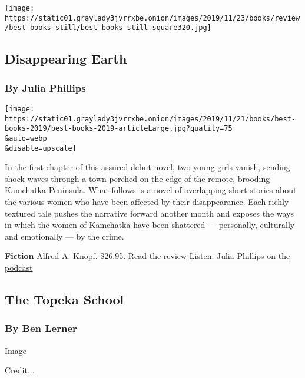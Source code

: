 \texttt{[image: https://static01.graylady3jvrrxbe.onion/images/2019/11/23/books/review/best-books-still/best-books-still-square320.jpg]}

\hypertarget{disappearing-earth}{%
\subsection{Disappearing Earth}\label{disappearing-earth}}

\hypertarget{by-julia-phillips}{%
\subsubsection{By Julia Phillips}\label{by-julia-phillips}}

\texttt{[image: https://static01.graylady3jvrrxbe.onion/images/2019/11/21/books/best-books-2019/best-books-2019-articleLarge.jpg?quality=75\\\&auto=webp\\\&disable=upscale]}

In the first chapter of this assured debut novel, two young girls
vanish, sending shock waves through a town perched on the edge of the
remote, brooding Kamchatka Peninsula. What follows is a novel of
overlapping short stories about the various women who have been affected
by their disappearance. Each richly textured tale pushes the narrative
forward another month and exposes the ways in which the women of
Kamchatka have been shattered --- personally, culturally and emotionally
--- by the crime.

\textbf{Fiction} \textbar{} Alfred A. Knopf. \$26.95. \textbar{}
\href{https://www.nytimes3xbfgragh.onion/2019/05/14/books/review/disappearing-earth-julia-phillips.html}{Read
the review} \textbar{}
\href{https://www.nytimes3xbfgragh.onion/2019/06/14/books/review/podcast-underland-robert-macfarlane-disappearing-earth-julia-phillips.html}{Listen:
Julia Phillips on the podcast}

\hypertarget{the-topeka-school}{%
\subsection{The Topeka School}\label{the-topeka-school}}

\hypertarget{by-ben-lerner}{%
\subsubsection{By Ben Lerner}\label{by-ben-lerner}}

Image

Credit...

